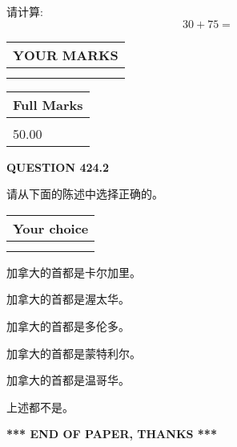 \documentclass{ctexart}
\begin{document}
  
 
请计算:
\begin{equation}
30 +  %
75 = \nonumber
\end{equation}
 

 

 
  
\vspace{0.2in}
  
\noindent\begin{tabular}{|l|}
\hline
 YOUR MARKS  \\
\hline
 \\ 
 \\ 
\hline
\end{tabular}
\hspace{0.05in} \begin{tabular}{|l|}
\hline
 Full Marks  \\
\hline
 \\ 
50.00 \\
\hline
\end{tabular}
{\textbf{\Large{QUESTION
424.2 
}}}
  
  
请从下面的陈述中选择正确的。
  
  
\noindent\hspace{3.0in} \begin{tabular}{|l|}
\hline
Your choice \\
\hline
 \\ 
 \\ 
\hline
\end{tabular}
  
  
 
 
加拿大的首都是卡尔加里。
 
 
加拿大的首都是渥太华。
 
 
加拿大的首都是多伦多。
 
 
加拿大的首都是蒙特利尔。
 
 
加拿大的首都是温哥华。
 
 
 上述都不是。
 
 
   
   
 \vspace{0.2in}
 
   
   
   
   
\vspace{1.0in} 
{\textbf{\large{ *** END OF PAPER, THANKS *** }}} 
   
\end{document}
